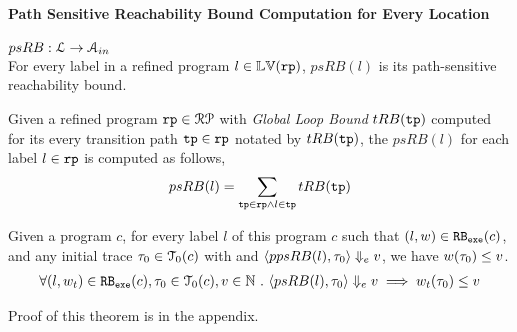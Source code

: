 \paragraph*{Path Sensitive Reachability Bound Computation for Every Location}
$psRB : \mathcal{L} \to \mathcal{A}_{in}$
\\
For every label in a refined program $l \in \mathbb{LV}(\mathtt{rp})$,
 $psRB(l)$ is its path-sensitive reachability bound.
 \\
 \begin{defn}
 \label{def:label_psrb}
Given a refined program $\mathtt{rp} \in \mathcal{RP}$ with 
\emph{Global Loop Bound} $tRB(\mathtt{tp})$
computed for its every transition path $\mathtt{tp} \in \mathtt{rp}$ notated by $tRB(\mathtt{tp})$,
the $psRB(l)$ for each label $l \in \mathtt{rp}$ is computed as follows,
\\
\[ psRB(l) = \sum\limits_{\mathtt{tp} \in \mathtt{rp} \land 
l \in \mathtt{tp}} tRB(\mathtt{tp})\]
 \end{defn}
\begin{thm}
 \label{thm:pathsensitive_rb_soundness}
Given a program ${c}$, for every label $l$ of this program $c$ such that $(l, w) \in \mathtt{RB_{exe}}(c)$, 
and any initial trace $\mathtt{\tau}_0 \in \mathcal{T}_0(c)$ with 
and $\langle ppsRB(l), \mathtt{\tau}_0 \rangle \Downarrow_e v$,
we have $ w(\mathtt{\tau}_0) \leq v $.
%
\[
 \begin{array}{l}
 \forall (l, w_{t}) \in \mathtt{RB_{exe}}(c),
 \mathtt{\tau}_0 \in \mathcal{T}_0(c), 
 v \in \mathbb{N} ~.~
 \langle psRB(l), \mathtt{\tau}_0 \rangle \Downarrow_e v
 \implies
 w_{t}(\mathtt{\tau}_0) \leq v
 \end{array}
\]
\end{thm}
%
Proof of this theorem is in the appendix.